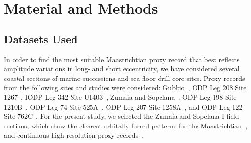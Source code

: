 \documentclass[draft]{agujournal2019}
\newcommand{\ma}[1]{Ma\(_{405}\)#1} %
\newcommand{\ijk}{\textcolor{blue}}
\begin{document}
\section{Material and Methods}\label{sec:mm}


\subsection{Datasets Used}\label{sec:data}

In order to find the most suitable Maastrichtian proxy record that best reflects amplitude variations in long- and short eccentricity,
we have considered several coastal sections of marine successions and sea floor drill core sites.
Proxy records from the following sites and studies were considered:
Gubbio~\cite{Voigt2012,Sinnesael2016}, %
ODP Leg 208 Site 1267~\cite{Westerhold2008,Husson2011}, %
IODP Leg 342 Site U1403~\cite{Batenburg2018}, %
Zumaia and Sopelana~\cite{tenKateSprenger1993,Batenburg2012,Batenburg2014,Dinares-Turell2013}, %
ODP Leg 198 Site 1210B~\cite{Jung2012,Kim2022}, %
ODP Leg 74 Site 525A~\cite{Husson2011}, %
ODP Leg 207 Site 1258A~, %
and ODP Leg 122 Site 762C~. %
For the present study, we selected the Zumaia and Sopelana I field sections,
which show the clearest orbitally-forced patterns for the Maastrichtian~\cite{tenKateSprenger1993,Batenburg2012,Dinares-Turell2013},
and continuous high-resolution proxy records~\cite{Batenburg2012,Batenburg2014}.
\end{document}
